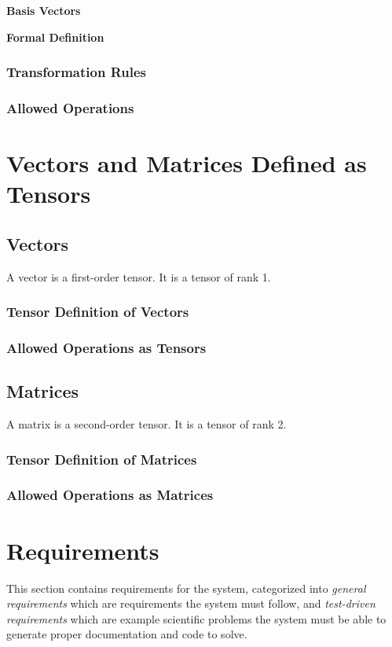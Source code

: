 \documentclass[12pt]{article}
\begin{document}
\medskip


\noindent\textbf{Basis Vectors}


\noindent\textbf{Formal Definition}

\subsubsection{Transformation Rules}

\subsubsection{Allowed Operations}


\section{Vectors and Matrices Defined as Tensors}\label{Sec:VecMatAsTensors}

\subsection{Vectors}
A vector is a first-order tensor. It is a tensor of rank 1.

\subsubsection{Tensor Definition of Vectors}

\subsubsection{Allowed Operations as Tensors}

\subsection{Matrices}
A matrix is a second-order tensor. It is a tensor of rank 2.

\subsubsection{Tensor Definition of Matrices}

\subsubsection{Allowed Operations as Matrices}


\section{Requirements}\label{Sec:Req}
This section contains requirements for the system, categorized into
\textit{general requirements} which are requirements the system must
follow, and \textit{test-driven requirements} which are example scientific
problems the system must be able to generate proper documentation and 
code to solve.
\end{document}
